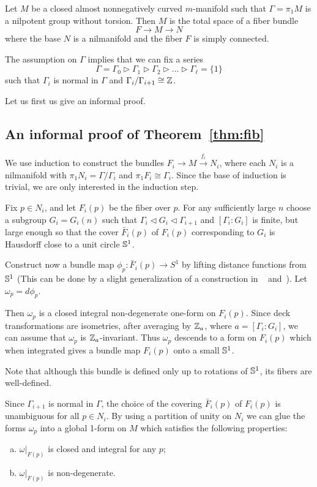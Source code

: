 \documentclass{amsart}
\begin{document}
\begin{thm}\label{thm:fib}

Let $M$ be a closed almost nonnegatively curved $m$-manifold
such that $\Gamma=\pi_1M$ is a nilpotent group without torsion.
Then  $M$
is the total space of a fiber bundle
$$
 F\to M\to N
$$
where the base $N$ is a nilmanifold and the fiber $F$ is simply connected.
\end{thm}

The assumption on $\Gamma$ implies that
we can fix a series
$$\Gamma=\Gamma_0\rhd\Gamma_1\rhd\Gamma_2\rhd\ldots\rhd\Gamma_\ell=\{1\}$$
such that $\Gamma_i$ is normal in $\Gamma$ and $\Gamma_i/\Gamma_{i+1}\cong {\Bbb Z}$.

Let us first us give an informal proof.

\subsection{An informal proof of Theorem~\ref{thm:fib}}
We use induction to construct the bundles
$F_i\longrightarrow M\overset{f_i}{\longrightarrow} N_i$, where each $N_i$ is a
nilmanifold with $\pi_1N_i=\Gamma/\Gamma_i$
and $\pi_1F_i\cong \Gamma_i$.
Since the base of induction is trivial,
we are only interested in the induction step.

Fix $p\in N_i$,
and let $F_i(p)$ be the fiber over $p$.
For any sufficiently large $n$
choose a subgroup $G_i=G_i(n)$
such that $\Gamma_{i}\lhd G_i\lhd \Gamma_{i+1}$ and
$[\Gamma_i: G_i]$ is finite,
but large enough so that the cover
$\bar{F}_i(p)$ of $F_i(p)$
corresponding to $G_i$ is Hausdorff close to a unit circle ${\Bbb S}^{1}$.


Construct now a bundle map $\phi_p\colon \bar F_i(p)\to S^{1}$
by lifting distance functions from ${\Bbb S}^{1}$
(This can be done by a slight generalization
of a construction in ~\cite{FY}  and~\cite{BGP}).
Let $\omega_p=d\phi_p$.

Then $\omega_p$
is a closed integral non-degenerate one-form on $F_i(p)$.
Since deck transformations are isometries,
after  averaging by ${\Bbb Z}_a$, where $a= [\Gamma_i: G_i]$,
we can assume that
$\omega_p$ is ${\Bbb Z}_a$-invariant.
Thus $\omega_p$ descends to a form on $F_i(p)$
which when integrated gives a bundle map $F_i(p)$ onto a small ${\Bbb S}^{1}$.

Note that although this bundle is defined only up to rotations of ${\Bbb S}^{1}$,
its fibers are well-defined.

Since $\Gamma_{i+1}$ is normal in $\Gamma$,
the choice of the covering $\bar{F}_i(p)$ of $F_i(p)$
is unambiguous for all $p\in N_i$.
By using a partition of unity on $N_i$ we can
glue the forms $\omega_p$ into a global 1-form on $M$
which  satisfies the following properties:
\begin{enumerate}[a)]
\item $\omega|_{F(p)}$ is closed  and integral for any $p$;
\item  $\omega|_{F(p)}$ is non-degenerate.
\end{enumerate}
\end{document}
